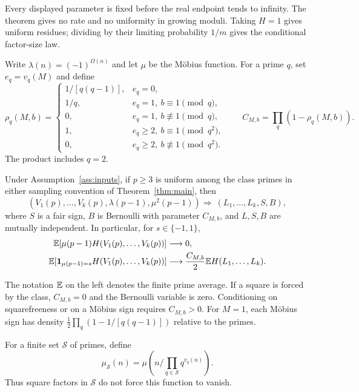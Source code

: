 Every displayed parameter is fixed before the real endpoint tends to
infinity. The theorem gives no rate and no uniformity in growing moduli.
Taking $H=1$ gives uniform residues; dividing by their limiting
probability $1/m$ gives the conditional factor-size law.

Write $\lambda(n)=(-1)^{\Omega(n)}$ and let $\mu$ be the M\"obius
function. For a prime $q$, set $e_q=v_q(M)$ and define
\begin{equation}\label{eq:rho}
 \rho_q(M,b)=
 \begin{cases}
  1/[q(q-1)],&e_q=0,\\
  1/q,&e_q=1,\ b\equiv1\pmod q,\\
  0,&e_q=1,\ b\not\equiv1\pmod q,\\
  1,&e_q\geq2,\ b\equiv1\pmod{q^2},\\
  0,&e_q\geq2,\ b\not\equiv1\pmod{q^2}.
 \end{cases}
 \qquad C_{M,b}=\prod_q(1-\rho_q(M,b)).
\end{equation}
The product includes $q=2$.

\begin{theorem}\label{thm:squarefree}
Under Assumption~\ref{ass:inputs}, if $p\geq3$ is uniform among the class
primes in either sampling convention of Theorem~\ref{thm:main}, then
\[
 (V_1(p),\ldots,V_k(p),\lambda(p-1),\mu^2(p-1))
 \Longrightarrow\ (L_1,\ldots,L_k,S,B),
\]
where $S$ is a fair sign, $B$ is Bernoulli with parameter $C_{M,b}$,
and $L,S,B$ are mutually independent. In particular, for $s\in\{-1,1\}$,
\begin{align}
 \mathbb E[\mu(p-1)H(V_1(p),\ldots,V_k(p))]&\longrightarrow0,\label{eq:mu}\\
 \mathbb E[\mathbf 1_{\mu(p-1)=s}H(V_1(p),\ldots,V_k(p))]
   &\longrightarrow\frac{C_{M,b}}2\mathbb E H(L_1,\ldots,L_k).\notag
\end{align}
\end{theorem}

The notation $\mathbb E$ on the left denotes the finite prime average.
If a square is forced by the class, $C_{M,b}=0$ and the Bernoulli
variable is zero. Conditioning on squarefreeness or on a M\"obius sign
requires $C_{M,b}>0$. For $M=1$, each M\"obius sign has density
$\tfrac12\prod_q(1-1/[q(q-1)])$ relative to the primes.

For a finite set $\mathcal S$ of primes, define
\[
 \mu_{\mathcal S}(n)=\mu\left(n\Big/\prod_{q\in\mathcal S}q^{v_q(n)}\right).
\]
Thus square factors in $\mathcal S$ do not force this function to vanish.

